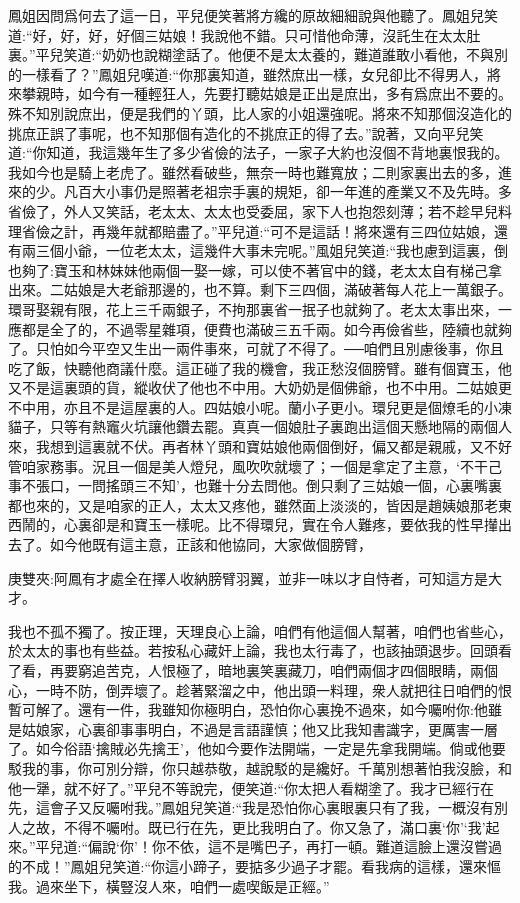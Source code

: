 \begin{parag}
    鳳姐因問爲何去了這一日，平兒便笑著將方纔的原故細細說與他聽了。鳳姐兒笑道:“好，好，好，好個三姑娘！我說他不錯。只可惜他命薄，沒託生在太太肚裏。”平兒笑道:“奶奶也說糊塗話了。他便不是太太養的，難道誰敢小看他，不與別的一樣看了？”鳳姐兒嘆道:“你那裏知道，雖然庶出一樣，女兒卻比不得男人，將來攀親時，如今有一種輕狂人，先要打聽姑娘是正出是庶出，多有爲庶出不要的。殊不知別說庶出，便是我們的丫頭，比人家的小姐還強呢。將來不知那個沒造化的挑庶正誤了事呢，也不知那個有造化的不挑庶正的得了去。”說著，又向平兒笑道:“你知道，我這幾年生了多少省儉的法子，一家子大約也沒個不背地裏恨我的。我如今也是騎上老虎了。雖然看破些，無奈一時也難寬放；二則家裏出去的多，進來的少。凡百大小事仍是照著老祖宗手裏的規矩，卻一年進的產業又不及先時。多省儉了，外人又笑話，老太太、太太也受委屈，家下人也抱怨刻薄；若不趁早兒料理省儉之計，再幾年就都賠盡了。”平兒道:“可不是這話！將來還有三四位姑娘，還有兩三個小爺，一位老太太，這幾件大事未完呢。”風姐兒笑道:“我也慮到這裏，倒也夠了:寶玉和林妹妹他兩個一娶一嫁，可以使不著官中的錢，老太太自有梯己拿出來。二姑娘是大老爺那邊的，也不算。剩下三四個，滿破著每人花上一萬銀子。環哥娶親有限，花上三千兩銀子，不拘那裏省一抿子也就夠了。老太太事出來，一應都是全了的，不過零星雜項，便費也滿破三五千兩。如今再儉省些，陸續也就夠了。只怕如今平空又生出一兩件事來，可就了不得了。──咱們且別慮後事，你且吃了飯，快聽他商議什麼。這正碰了我的機會，我正愁沒個膀臂。雖有個寶玉，他又不是這裏頭的貨，縱收伏了他也不中用。大奶奶是個佛爺，也不中用。二姑娘更不中用，亦且不是這屋裏的人。四姑娘小呢。蘭小子更小。環兒更是個燎毛的小凍貓子，只等有熱竈火坑讓他鑽去罷。真真一個娘肚子裏跑出這個天懸地隔的兩個人來，我想到這裏就不伏。再者林丫頭和寶姑娘他兩個倒好，偏又都是親戚，又不好管咱家務事。況且一個是美人燈兒，風吹吹就壞了；一個是拿定了主意，‘不干己事不張口，一問搖頭三不知’，也難十分去問他。倒只剩了三姑娘一個，心裏嘴裏都也來的，又是咱家的正人，太太又疼他，雖然面上淡淡的，皆因是趙姨娘那老東西鬧的，心裏卻是和寶玉一樣呢。比不得環兒，實在令人難疼，要依我的性早攆出去了。如今他既有這主意，正該和他協同，大家做個膀臂，\begin{note}庚雙夾:阿鳳有才處全在擇人收納膀臂羽翼，並非一味以才自恃者，可知這方是大才。\end{note}我也不孤不獨了。按正理，天理良心上論，咱們有他這個人幫著，咱們也省些心，於太太的事也有些益。若按私心藏奸上論，我也太行毒了，也該抽頭退步。回頭看了看，再要窮追苦克，人恨極了，暗地裏笑裏藏刀，咱們兩個才四個眼睛，兩個心，一時不防，倒弄壞了。趁著緊溜之中，他出頭一料理，衆人就把往日咱們的恨暫可解了。還有一件，我雖知你極明白，恐怕你心裏挽不過來，如今囑咐你:他雖是姑娘家，心裏卻事事明白，不過是言語謹慎；他又比我知書識字，更厲害一層了。如今俗語‘擒賊必先擒王’，他如今要作法開端，一定是先拿我開端。倘或他要駁我的事，你可別分辯，你只越恭敬，越說駁的是纔好。千萬別想著怕我沒臉，和他一犟，就不好了。”平兒不等說完，便笑道:“你太把人看糊塗了。我才已經行在先，這會子又反囑咐我。”鳳姐兒笑道:“我是恐怕你心裏眼裏只有了我，一概沒有別人之故，不得不囑咐。既已行在先，更比我明白了。你又急了，滿口裏‘你’‘我’起來。”平兒道:“偏說‘你’！你不依，這不是嘴巴子，再打一頓。難道這臉上還沒嘗過的不成！”鳳姐兒笑道:“你這小蹄子，要掂多少過子才罷。看我病的這樣，還來慪我。過來坐下，橫豎沒人來，咱們一處喫飯是正經。”
\end{parag}


